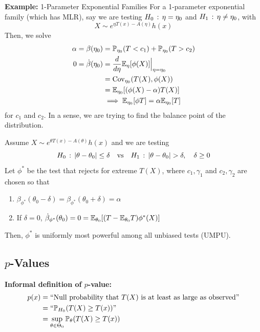 \begin{example}{\textbf{Example:} 1-Parameter Exponential Families}
    For a 1-parameter exponential family (which has MLR), say we are testing $H_0 \, :\, \eta = \eta_0$ and $H_1 \, :\, \eta \neq \eta_0$, with
    \[ X \sim e^{\eta T(x) - A(\eta)}h(x) \]
    Then, we solve
    \begin{align*}
        \alpha = \beta(\eta_0) &= \mathbb{P}_{\eta_0}(T < c_1) + \mathbb{P}_{\eta_0}(T > c_2)\\
        0 = \dot{\beta}(\eta_0) &= \frac{d}{d\eta}\mathbb{E}_{\eta}[\phi(X)]\Big|_{\eta = \eta_0}\\
        &= \text{Cov}_{\eta_0}(T(X), \phi(X))\\
        &= \mathbb{E}_{\eta_0}[(\phi(X) - \alpha)T(X)]\\
        &\implies \mathbb{E}_{\eta_0}[\phi T] = \alpha\mathbb{E}_{\eta_0}[T]
    \end{align*}
    for $c_1$ and $c_2$. In a sense, we are trying to find the balance point of the distribution.
\end{example}

\begin{theorem}
    Assume $X \sim e^{\theta T(x) - A(\theta)}h(x)$ and we are testing
    \[ H_0 \, :\, \left\lvert {\theta - \theta_0} \right\rvert \leq \delta \quad \text{vs} \quad H_1 \, :\, \left\lvert {\theta - \theta_0} \right\rvert > \delta, \quad \delta \geq 0 \]
    Let $\phi^{*}$ be the test that rejects for extreme $T(X)$, where $c_1, \gamma_1$ and $c_2, \gamma_2$ are chosen so that
    \begin{enumerate}[label = (\roman*)]
        \item $\beta_{\phi^{*}}(\theta_0 - \delta) = \beta_{\phi^{*}}(\theta_0 + \delta) = \alpha$
        \item If $\delta = 0$, $\dot{\beta}_{\phi^{*}}(\theta_0) = 0 = \mathbb{E}_{\theta_0}[(T - \mathbb{E}_{\theta_0}T)\phi^{*}(X)]$
    \end{enumerate}
    Then, $\phi^{*}$ is uniformly most powerful among all unbiased tests (UMPU).
\end{theorem}

\subsection*{$p$-Values}
\sectionspace

\textbf{Informal definition of $p$-value:}
\begin{align*}
    p(x) &= \text{``Null probability that } T(X) \text{ is at least as large as observed''}\\
    &= \text{``}\mathbb{P}_{H_0}(T(X) \geq T(x))\text{''}\\
    &= \sup_{\theta \in \Theta_0} \mathbb{P}_{\theta}(T(X) \geq T(x))
\end{align*}

